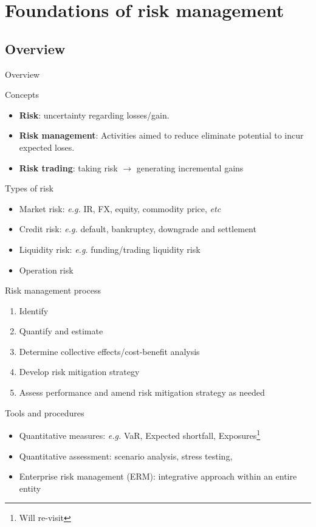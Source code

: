\section{Foundations of risk management}
\subsection{Overview}

\begin{frame}[allowframebreaks]{Overview}
\begin{block}{Concepts}
\begin{itemize}
\item \textbf{Risk}: uncertainty regarding losses/gain.
\item \textbf{Risk management}: Activities aimed to reduce eliminate potential to incur expected loses.
\item \textbf{Risk trading}: taking risk $\to$ generating incremental gains
\end{itemize}
\end{block}

\begin{block}{Types of risk}
\begin{itemize}
\item Market risk: \textit{e.g.} IR, FX, equity, commodity price, \textit{etc}
\item Credit risk: \textit{e.g.} default, bankruptcy, downgrade and settlement
\item Liquidity risk: \textit{e.g.} funding/trading liquidity risk
\item Operation risk
\end{itemize}
\end{block}

\begin{block}{Risk management process}
\begin{enumerate}
\item Identify 
\item Quantify and estimate
\item Determine collective effects/cost-benefit analysis
\item Develop risk mitigation strategy
\item Assess performance and amend risk mitigation strategy as needed
\end{enumerate}
\end{block}

\begin{block}{Tools and procedures}
\begin{itemize}
\item Quantitative measures: \textit{e.g.} VaR, Expected shortfall, Exposures\footnote{Will re-visit}  
\item Quantitative assessment: scenario analysis, stress testing, 
\item Enterprise risk management (ERM): integrative approach within an entire entity
\end{itemize}
\end{block}


\end{frame}
